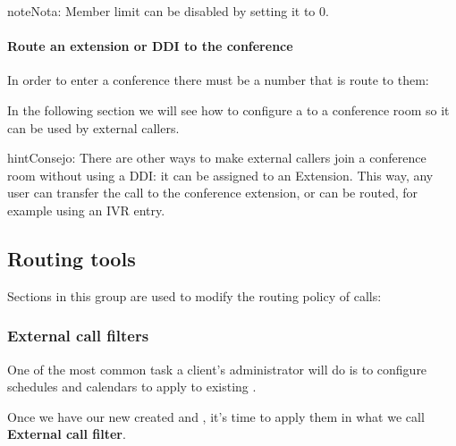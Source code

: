 \documentclass[letterpaper,10pt,spanish]{sphinxmanual}
\begin{document}
\begin{notice}{note}{Nota:}
Member limit can be disabled by setting it to 0.
\end{notice}
\paragraph{Route an extension or DDI to the conference}

In order to enter a conference there must be a number that is route to them:

In the following section we will see how to configure a {\hyperref[administration_portal/brand/views/ddis:ddis]{}} to a conference room so it can be used by external callers.

\begin{notice}{hint}{Consejo:}
There are other ways to make external callers join a conference room
without using a DDI: it can be assigned to an Extension. This way, any user
can transfer the call to the conference extension, or can be routed, for
example using an IVR entry.
\end{notice}


\subsection{Routing tools}
\label{administration_portal/client/vpbx/routing_tools/index::doc}\label{administration_portal/client/vpbx/routing_tools/index:routing-tools}
Sections in this group are used to modify the routing policy of calls:
\label{administration_portal/client/vpbx/routing_tools/external_call_filters:external-filters}

\subsubsection{External call filters}
\label{administration_portal/client/vpbx/routing_tools/external_call_filters:external-call-filters}\label{administration_portal/client/vpbx/routing_tools/external_call_filters:external-filters}\label{administration_portal/client/vpbx/routing_tools/external_call_filters::doc}\label{administration_portal/client/vpbx/routing_tools/external_call_filters:id1}
One of the most common task a client's administrator will do is to
configure schedules and calendars to apply to existing {\hyperref[administration_portal/brand/views/ddis:ddis]{}}.

Once we have our new created {\hyperref[administration_portal/client/vpbx/routing_tools/schedules:schedules]{}} and {\hyperref[administration_portal/client/vpbx/routing_tools/calendars:calendars]{}}, it's time to apply them
in what we call \textbf{External call filter}.
\end{document}
